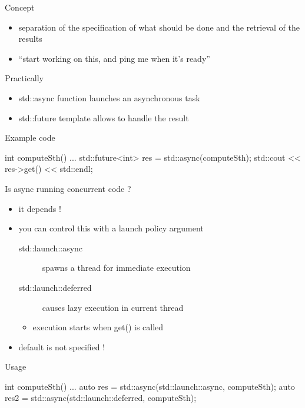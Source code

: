 \begin{frame}[fragile]
  \begin{block}{Concept}
    \begin{itemize}
    \item separation of the specification of what should be done and the retrieval of the results
    \item ``start working on this, and ping me when it's ready''
    \end{itemize}
  \end{block}
  \pause
  \begin{block}{Practically}
    \begin{itemize}
    \item std::async function launches an asynchronous task
    \item std::future template allows to handle the result
    \end{itemize}
  \end{block}
  \pause
  \begin{exampleblock}{Example code}
    \begin{cppcode*}{}
      int computeSth() {...}
      std::future<int> res = std::async(computeSth);
      std::cout << res->get() << std::endl;
    \end{cppcode*}
  \end{exampleblock}
\end{frame}

\begin{frame}[fragile]
  \begin{block}{Is async running concurrent code ?}
    \begin{itemize}
    \item it depends !
    \item you can control this with a launch policy argument
      \begin{description}
      \item[std::launch::async] spawns a thread for immediate execution
      \item[std::launch::deferred] causes lazy execution in current thread
      \end{description}
      \begin{itemize}
      \item execution starts when get() is called
      \end{itemize}
    \item default is not specified !
    \end{itemize}
  \end{block}
  \pause
  \begin{exampleblock}{Usage}
    \begin{cppcode*}{}
      int computeSth() {...}
      auto res = std::async(std::launch::async,
                            computeSth);
      auto res2 = std::async(std::launch::deferred,
                             computeSth);
    \end{cppcode*}
  \end{exampleblock}
\end{frame}


